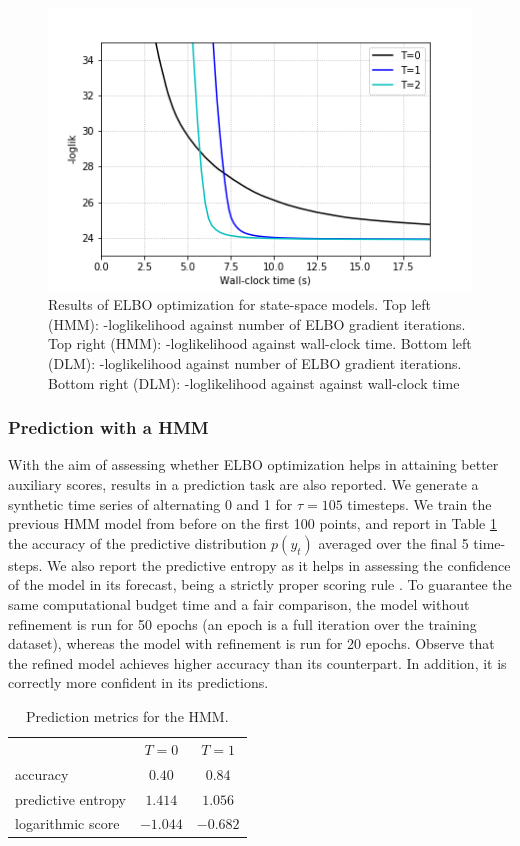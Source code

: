 \begin{figure}[!htb]
 \endminipage
  \includegraphics[width=\linewidth]{img/dlm_times.png}
\endminipage
\caption{Results of ELBO optimization for state-space models. Top left (HMM): -loglikelihood against number of ELBO gradient iterations. Top right (HMM): -loglikelihood against wall-clock time. Bottom left (DLM): -loglikelihood against number of ELBO gradient iterations. Bottom right (DLM): -loglikelihood against against wall-clock time}\label{fig:ss}
\end{figure}
    
\subsubsection{Prediction  with a HMM} 
With the aim of assessing whether ELBO optimization helps in attaining better auxiliary scores, results in a prediction task are also reported. We generate a synthetic time series of alternating 0 and 1 for $\tau=105$ timesteps. We train the previous HMM model from before on the first 100 points, and report in Table \ref{tbl:preds} the accuracy of the predictive distribution $p(y_t)$ averaged over the final 5 time-steps. We also report the predictive entropy as it helps in assessing the confidence of the model in its forecast, being a strictly proper scoring rule \cite{gneiting2007strictly}. To guarantee the same computational budget time and a fair comparison, the model without refinement is run for 50 epochs (an epoch is a full iteration over the training dataset), whereas the model with refinement is run for 20 epochs. Observe that the refined model achieves higher accuracy than its counterpart. In addition,
it is correctly more confident in its predictions.
\begin{table}[!ht]
\centering
\caption{Prediction metrics for the HMM.}\label{tbl:preds}
\begin{tabular}{lcc}
\cline{1-3}
   & $T=0$                             & $T=1$   \\ 
 \cline{1-3}
    accuracy          & $0.40$ &  $\bm{0.84}$ \\
    predictive entropy          & $1.414$ &  $\bm{1.056}$ \\
    logarithmic score   & $-1.044$ & $\bm{-0.682}$ \\
 \cline{1-3}
\end{tabular}
\end{table}

